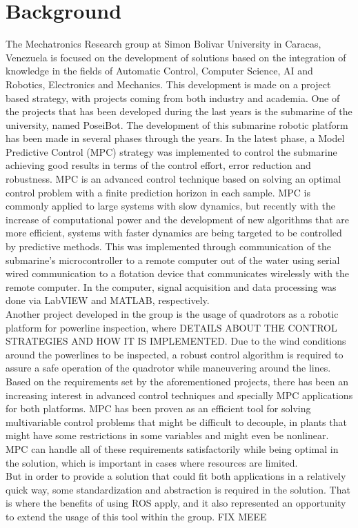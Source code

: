 \section{Background}
\label{chap:Background}

The Mechatronics Research group at Simon Bolivar University in Caracas, Venezuela is focused on the development of solutions based on the integration of knowledge in the fields of Automatic Control, Computer Science, AI and Robotics, Electronics and Mechanics. This development is made on a project based strategy, with projects coming from both industry and academia. One of the projects that has been developed during the last years is the submarine of the university, named PoseiBot. The development of this submarine robotic platform has been made in several phases through the years. In the latest phase, a Model Predictive Control (MPC) strategy was implemented to control the submarine achieving good results in terms of the control effort, error reduction and robustness. MPC is an advanced control technique based on solving an optimal control problem with a finite prediction horizon in each sample. MPC is commonly applied to large systems with slow dynamics, but recently with the increase of computational power and the development of new algorithms that are more efficient, systems with faster dynamics are being targeted to be controlled by predictive methods. This was implemented through communication of the submarine's microcontroller to a remote computer out of the water using serial wired communication to a flotation device that communicates wirelessly with the remote computer. In the computer, signal acquisition  and data processing was done via LabVIEW \texttrademark  and MATLAB\textsuperscript{\textregistered}, respectively. \\

Another project developed in the group is the usage of quadrotors as a robotic platform for powerline inspection, where DETAILS ABOUT THE CONTROL STRATEGIES AND HOW IT IS IMPLEMENTED. Due to the wind conditions around the powerlines to be inspected, a robust control algorithm is required to assure a safe operation of the quadrotor while maneuvering around the lines.\\

Based on the requirements set by the aforementioned projects, there has been an increasing interest in advanced control techniques and specially MPC applications for both platforms. MPC has been proven as an efficient tool for solving multivariable control problems that might be difficult to decouple, in plants that might have some restrictions in some variables and might even be nonlinear. MPC can handle all of these requirements satisfactorily while being optimal in the solution, which is important in cases where resources are limited.\\




But in order to provide a solution that could fit both applications in a relatively quick way, some standardization and abstraction is required in the solution. That is where the benefits of using ROS apply, and it also represented an opportunity to extend the usage of this tool within the group. FIX MEEE
